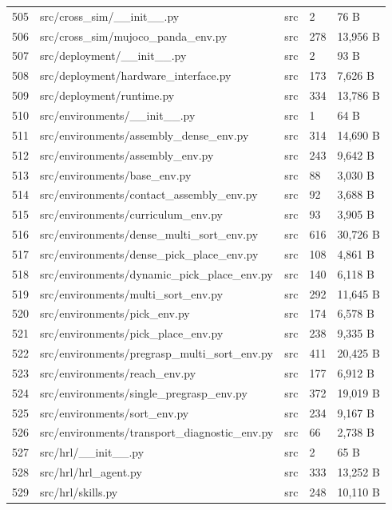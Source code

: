 \documentclass[11pt,a4paper,oneside]{book}
\begin{document}
\begin{longtable}{l l l l l}
505 & src/cross\_sim/\_\_init\_\_.py & src & 2 & 76 B \\
506 & src/cross\_sim/mujoco\_panda\_env.py & src & 278 & 13,956 B \\
507 & src/deployment/\_\_init\_\_.py & src & 2 & 93 B \\
508 & src/deployment/hardware\_interface.py & src & 173 & 7,626 B \\
509 & src/deployment/runtime.py & src & 334 & 13,786 B \\
510 & src/environments/\_\_init\_\_.py & src & 1 & 64 B \\
511 & src/environments/assembly\_dense\_env.py & src & 314 & 14,690 B \\
512 & src/environments/assembly\_env.py & src & 243 & 9,642 B \\
513 & src/environments/base\_env.py & src & 88 & 3,030 B \\
514 & src/environments/contact\_assembly\_env.py & src & 92 & 3,688 B \\
515 & src/environments/curriculum\_env.py & src & 93 & 3,905 B \\
516 & src/environments/dense\_multi\_sort\_env.py & src & 616 & 30,726 B \\
517 & src/environments/dense\_pick\_place\_env.py & src & 108 & 4,861 B \\
518 & src/environments/dynamic\_pick\_place\_env.py & src & 140 & 6,118 B \\
519 & src/environments/multi\_sort\_env.py & src & 292 & 11,645 B \\
520 & src/environments/pick\_env.py & src & 174 & 6,578 B \\
521 & src/environments/pick\_place\_env.py & src & 238 & 9,335 B \\
522 & src/environments/pregrasp\_multi\_sort\_env.py & src & 411 & 20,425 B \\
523 & src/environments/reach\_env.py & src & 177 & 6,912 B \\
524 & src/environments/single\_pregrasp\_env.py & src & 372 & 19,019 B \\
525 & src/environments/sort\_env.py & src & 234 & 9,167 B \\
526 & src/environments/transport\_diagnostic\_env.py & src & 66 & 2,738 B \\
527 & src/hrl/\_\_init\_\_.py & src & 2 & 65 B \\
528 & src/hrl/hrl\_agent.py & src & 333 & 13,252 B \\
529 & src/hrl/skills.py & src & 248 & 10,110 B \\

\end{longtable}
\end{document}
